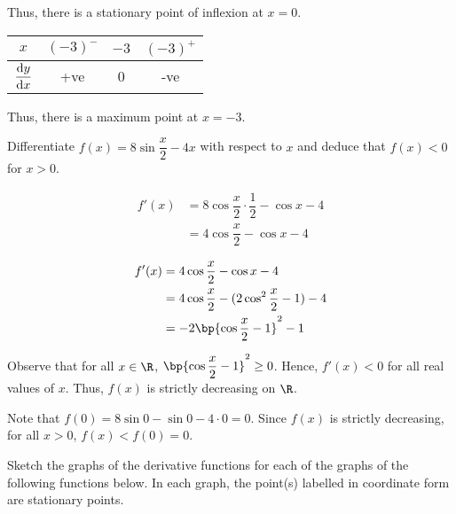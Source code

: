 \documentclass{echw}
\begin{document}
        Thus, there is a stationary point of inflexion at $x = 0$.

        \begin{table}[h]
            \centering
            \begin{tabular}{|c|c|c|c|}
            \hline
            $x$          & $(-3)^-$ & $-3$ & $(-3)^+$ \\\hline
            $\dfrac{\mathrm{d} y}{\mathrm{d} x}$ & +ve   & 0 & -ve   \\[1ex]\hline
            \end{tabular}
        \end{table}

        Thus, there is a maximum point at $x=-3$.


    \problem{}
        Differentiate $f(x) = 8\sin \dfrac{x}2 - 4x$ with respect to $x$ and deduce that $f(x) < 0$ for $x>0$.

    \solution
        \begin{align*}
            f'(x) &= 8\cos \dfrac{x}2 \cdot \dfrac12 - \cos x - 4\\
            &= 4\cos\dfrac{x}2 - \cos x- 4
        \end{align*}


        \begin{align*}
            f'(x) &= 4\cos\dfrac{x}2 - \cos x- 4\\
            &= 4\cos \dfrac{x}2 - (2\cos^2 \dfrac{x}2 - 1) - 4\\
            &= -2\bp{\cos\dfrac{x}2 - 1}^2 - 1
        \end{align*}

        Observe that for all $x \in \R$, $\bp{\cos\dfrac{x}2 - 1}^2 \geq 0$. Hence, $f'(x) < 0$ for all real values of $x$. Thus, $f(x)$ is strictly decreasing on $\R$.

        Note that $f(0) = 8\sin 0 - \sin 0 - 4 \cdot 0 = 0$. Since $f(x)$ is strictly decreasing, for all $x > 0$, $f(x) < f(0) = 0$.

    \problem{}
        Sketch the graphs of the derivative functions for each of the graphs of the following functions below. In each graph, the point(s) labelled in coordinate form are stationary points.
\end{document}
